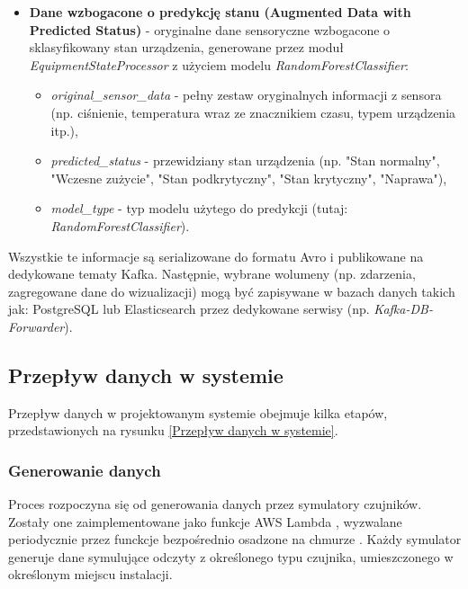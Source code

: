 \begin{itemize}
    \item \textbf{Dane wzbogacone o predykcję stanu (Augmented Data with Predicted Status)} - oryginalne dane sensoryczne wzbogacone o sklasyfikowany stan urządzenia, generowane przez moduł \textit{EquipmentStateProcessor} z użyciem modelu \textit{RandomForestClassifier}:
    \begin{itemize}
        \item \textit{original\_sensor\_data} - pełny zestaw oryginalnych informacji z sensora (np. ciśnienie, temperatura wraz ze znacznikiem czasu, typem urządzenia itp.),
        \item \textit{predicted\_status} - przewidziany stan urządzenia (np. "Stan normalny", "Wczesne zużycie", "Stan podkrytyczny", "Stan krytyczny", "Naprawa"),
        \item \textit{model\_type} - typ modelu użytego do predykcji (tutaj: \textit{RandomForestClassifier}).
    \end{itemize}
\end{itemize}

\vspace{0.3em}

Wszystkie te informacje są serializowane do formatu Avro i publikowane na dedykowane tematy Kafka. Następnie, wybrane wolumeny (np. zdarzenia, zagregowane dane do wizualizacji) mogą być zapisywane w bazach danych takich jak: PostgreSQL lub Elasticsearch przez dedykowane serwisy (np. \textit{Kafka-DB-Forwarder}).

\newpage

\subsection{Przepływ danych w systemie}
\label{subsec:przeplyw_danych}

Przepływ danych w projektowanym systemie obejmuje kilka etapów, przedstawionych na rysunku \ref{Przepływ danych w systemie}.


\subsubsection{Generowanie danych}
\label{subsubsec:generowanie_danych}

Proces rozpoczyna się od generowania danych przez symulatory czujników. Zostały one zaimplementowane jako funkcje AWS Lambda \cite{aws_lambda_docs},
wyzwalane periodycznie przez funckcje bezpośrednio osadzone na chmurze  \cite{aws_step_functions_docs}.
Każdy symulator generuje dane symulujące odczyty z określonego typu czujnika,
umieszczonego w określonym miejscu instalacji.

